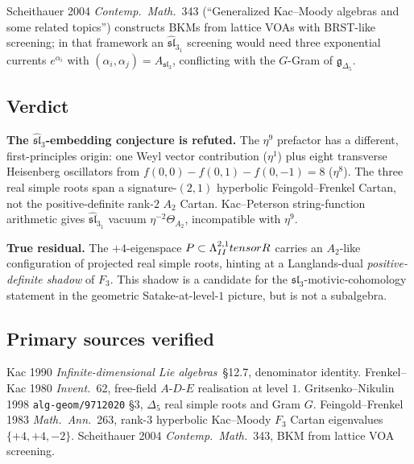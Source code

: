 \documentclass[12pt]{article}
\providecommand{\gDelta}{\mathfrak{g}_{\Delta_5}}
\providecommand{\slhat}[1]{\widehat{\mathfrak{sl}}_{#1}}
\providecommand{\sl}[1]{\mathfrak{sl}_{#1}}
\providecommand{\LambII}{\Lambda^{2,1}_{II}}
\providecommand{\FF}{F_3}
\begin{document}
Scheithauer 2004 \emph{Contemp.\ Math.}~343 (``Generalized
Kac--Moody algebras and some related topics'') constructs
BKMs from lattice VOAs with BRST-like screening; in that
framework an $\slhat{3}_1$ screening would need three
exponential currents $e^{\alpha_i}$ with $(\alpha_i,\alpha_j) =
A_{\sl{3}}$, conflicting with the $G$-Gram of $\gDelta$.

\subsection*{Verdict}

\textbf{The $\slhat{3}$-embedding conjecture is refuted.} The
$\eta^9$ prefactor has a different, first-principles origin:
one Weyl vector contribution ($\eta^1$) plus eight transverse
Heisenberg oscillators from $f(0,0) - f(0,1) - f(0,-1) = 8$
($\eta^8$). The three real simple roots span a
signature-$(2,1)$ hyperbolic Feingold--Frenkel Cartan, not the
positive-definite rank-$2$ $A_2$ Cartan. Kac--Peterson
string-function arithmetic gives $\slhat{3}_1$ vacuum
$\eta^{-2}\Theta_{A_2}$, incompatible with $\eta^9$.

\textbf{True residual.} The $+4$-eigenspace $P \subset
\LambII \otimes \R$ carries an $A_2$-like configuration of
projected real simple roots, hinting at a Langlands-dual
\emph{positive-definite shadow} of $\FF$. This shadow is a
candidate for the $\sl{3}$-motivic-cohomology statement in
the geometric Satake-at-level-$1$ picture, but is not a
subalgebra.

\subsection*{Primary sources verified}

Kac 1990 \emph{Infinite-dimensional Lie algebras}~\S 12.7,
denominator identity. Frenkel--Kac 1980 \emph{Invent.}~62,
free-field $A$-$D$-$E$ realisation at level $1$.
Gritsenko--Nikulin 1998 \texttt{alg-geom/9712020} \S3,
$\Delta_5$ real simple roots and Gram $G$. Feingold--Frenkel
1983 \emph{Math.\ Ann.}~263, rank-$3$ hyperbolic Kac--Moody
$F_3$ Cartan eigenvalues $\{+4,+4,-2\}$. Scheithauer 2004
\emph{Contemp.\ Math.}~343, BKM from lattice VOA screening.
\end{document}
